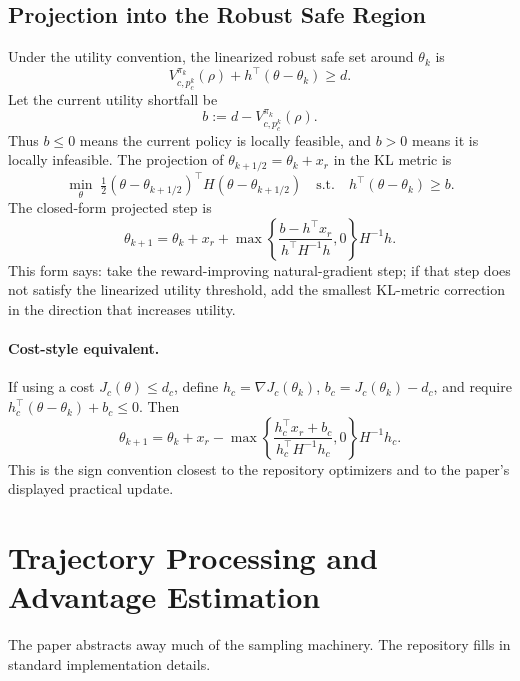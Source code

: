 \documentclass[11pt]{article}
\newcommand{\half}{\tfrac12}
\begin{document}
\subsection{Projection into the Robust Safe Region}
Under the utility convention, the linearized robust safe set around $\theta_k$ is
\begin{equation}
    V_{c,p_c^k}^{\pi_k}(\rho)+h^\top(\theta-\theta_k)\ge d.
    \label{eq:linear-safe-set}
\end{equation}
Let the current utility shortfall be
\begin{equation}
    b := d - V_{c,p_c^k}^{\pi_k}(\rho).
\end{equation}
Thus $b\le0$ means the current policy is locally feasible, and $b>0$ means it is locally infeasible.  The projection of $\theta_{k+1/2}=\theta_k+x_r$ in the KL metric is
\begin{equation}
    \min_\theta\;\half(\theta-\theta_{k+1/2})^\top H(\theta-\theta_{k+1/2})
    \quad\text{s.t.}\quad
    h^\top(\theta-\theta_k)\ge b.
    \label{eq:utility-projection}
\end{equation}
The closed-form projected step is
\begin{equation}
    \boxed{
    \theta_{k+1}=\theta_k+x_r+
    \max\!\left\{\frac{b-h^\top x_r}{h^\top H^{-1}h},0\right\}H^{-1}h .}
    \label{eq:utility-closed-form}
\end{equation}
This form says: take the reward-improving natural-gradient step; if that step does not satisfy the linearized utility threshold, add the smallest KL-metric correction in the direction that increases utility.

\paragraph{Cost-style equivalent.}
If using a cost $J_c(\theta)\le d_c$, define $h_c=\nabla J_c(\theta_k)$, $b_c=J_c(\theta_k)-d_c$, and require $h_c^\top(\theta-\theta_k)+b_c\le0$.  Then
\begin{equation}
    \theta_{k+1}=\theta_k+x_r-
    \max\!\left\{\frac{h_c^\top x_r+b_c}{h_c^\top H^{-1}h_c},0\right\}H^{-1}h_c .
    \label{eq:cost-closed-form}
\end{equation}
This is the sign convention closest to the repository optimizers and to the paper's displayed practical update.

\section{Trajectory Processing and Advantage Estimation}
The paper abstracts away much of the sampling machinery.  The repository fills in standard implementation details.
\end{document}

